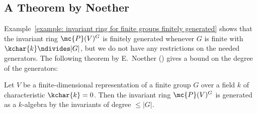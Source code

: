 \subsection{A Theorem by Noether}


\begin{fluff}
  Example~\ref{example: invariant ring for finite groups finitely generated} shows that the invariant ring $\mc{P}(V)^G$ is finitely generated whenever $G$ is finite with $\kchar{k} \ndivides |G|$, but we do not have any restrictions on the needed generators.
  The following theorem by E.\ Noether (\cite{Noether1915}) gives a bound on the degree of the generators:
\end{fluff}


\begin{theorem}[Noether]
  Let $V$ be a finite-dimensional representation of a finite group $G$ over a field $k$ of characteristic $\kchar{k} = 0$.
  Then the invariant ring $\mc{P}(V)^G$ is generated as a $k$-algebra by the invariants of degree $\leq |G|$.
\end{theorem}


